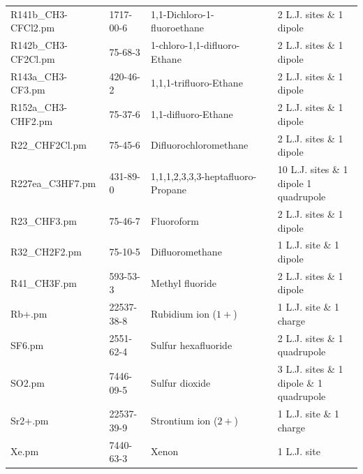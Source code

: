 \begin{landscape}
\begin{longtable}{lllll}
	R141b\_CH3-CFCl2.pm & 1717-00-6 & 1,1-Dichloro-1-fluoroethane & \parencite{Stoll2003} & 2 L.J. sites \& 1 dipole \\
	R142b\_CH3-CF2Cl.pm & 75-68-3 & 1-chloro-1,1-difluoro-Ethane & \parencite{Stoll2003} & 2 L.J. sites \& 1 dipole \\
	R143a\_CH3-CF3.pm & 420-46-2 & 1,1,1-trifluoro-Ethane & \parencite{Stoll2003} & 2 L.J. sites \& 1 dipole \\
	R152a\_CH3-CHF2.pm & 75-37-6 & 1,1-difluoro-Ethane & \parencite{Stoll2003} & 2 L.J. sites \& 1 dipole \\
	R22\_CHF2Cl.pm & 75-45-6 & Difluorochloromethane & \parencite{Stoll2003} & 2 L.J. sites \& 1 dipole \\
	R227ea\_C3HF7.pm & 431-89-0 & 1,1,1,2,3,3,3-heptafluoro-Propane & \parencite{Eckl2007} & 10 L.J. sites \& 1 dipole 1 quadrupole \\
	R23\_CHF3.pm & 75-46-7 & Fluoroform & \parencite{Stoll2003} & 2 L.J. sites \& 1 dipole \\
	R32\_CH2F2.pm & 75-10-5 & Difluoromethane & \parencite{Stoll2003} & 1 L.J. site \& 1 dipole \\
	R41\_CH3F.pm & 593-53-3 & Methyl fluoride & \parencite{Stoll2003} & 2 L.J. sites \& 1 dipole \\
	Rb+.pm & 22537-38-8 & Rubidium ion ($1+$) & \parencite{Reiser2014} & 1 L.J. site \& 1 charge \\
	SF6.pm & 2551-62-4 & Sulfur hexafluoride & \parencite{Vrabec2001} & 2 L.J. sites \& 1 quadrupole \\
	SO2.pm & 7446-09-5 & Sulfur dioxide & \parencite{Eckl2008_C} & 3 L.J. sites \& 1 dipole \& 1 quadrupole \\
	Sr2+.pm & 22537-39-9 & Strontium ion ($2+$) & \parencite{Deublein2012_A} & 1 L.J. site \& 1 charge \\
	Xe.pm & 7440-63-3 & Xenon & \parencite{Vrabec2001} & 1 L.J. site \\
%

\end{longtable}
\end{landscape}
